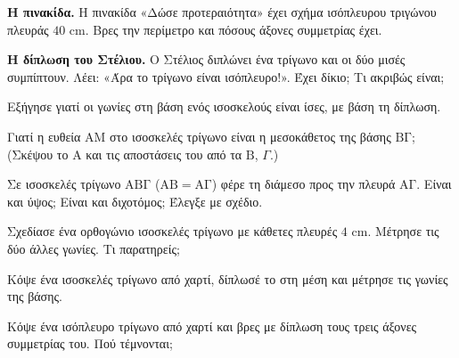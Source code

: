 \ex \textbf{Η πινακίδα.} Η πινακίδα «Δώσε προτεραιότητα» έχει σχήμα ισόπλευρου τριγώνου πλευράς $40$ cm. Βρες την περίμετρο και πόσους άξονες συμμετρίας έχει.

\ex \textbf{Η δίπλωση του Στέλιου.} Ο Στέλιος διπλώνει ένα τρίγωνο και οι δύο μισές συμπίπτουν. Λέει: «Άρα το τρίγωνο είναι ισόπλευρο!». Έχει δίκιο; Τι ακριβώς είναι;


\ex Εξήγησε γιατί οι γωνίες στη βάση ενός ισοσκελούς είναι ίσες, με βάση τη δίπλωση.

\ex Γιατί η ευθεία $\mathrm{ΑΜ}$ στο ισοσκελές τρίγωνο είναι η μεσοκάθετος της βάσης $\mathrm{ΒΓ}$; (Σκέψου το $\mathrm{Α}$ και τις αποστάσεις του από τα $\mathrm{Β}$, $\Gamma$.)

\ex Σε ισοσκελές τρίγωνο $\mathrm{ΑΒΓ}$ ($\mathrm{ΑΒ}=\mathrm{ΑΓ}$) φέρε τη διάμεσο προς την πλευρά $\mathrm{ΑΓ}$. Είναι και ύψος; Είναι και διχοτόμος; Έλεγξε με σχέδιο.

\ex Σχεδίασε ένα ορθογώνιο ισοσκελές τρίγωνο με κάθετες πλευρές $4$ cm. Μέτρησε τις δύο άλλες γωνίες. Τι παρατηρείς;


\ex Κόψε ένα ισοσκελές τρίγωνο από χαρτί, δίπλωσέ το στη μέση και μέτρησε τις γωνίες της βάσης.

\ex Κόψε ένα ισόπλευρο τρίγωνο από χαρτί και βρες με δίπλωση τους τρεις άξονες συμμετρίας του. Πού τέμνονται;
